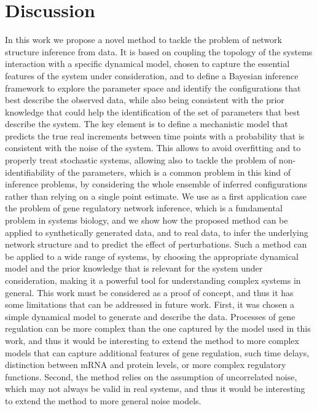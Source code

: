 \documentclass[10pt, aps, rmp,  twocolumn, superscriptaddress, floatfix, showkeys]{revtex4-2}
\begin{document}
\section{Discussion}
In this work we propose a novel method to tackle the problem of network structure inference from data. It is based on coupling the topology of the systems interaction with a specific dynamical model, chosen to capture the essential features of the system under consideration, and to define a Bayesian inference framework to explore the parameter space and identify the configurations that best describe the observed data, while also being consistent with the prior knowledge that could help the identification of the set of parameters that best describe the system. The key element is to define a mechanistic model that predicts the true real increments between time points with a probability that is consistent with the noise of the system. This allows to avoid overfitting and to properly treat stochastic systems, allowing also to tackle the problem of non-identifiability of the parameters, which is a common problem in this kind of inference problems, by considering the whole ensemble of inferred configurations rather than relying on a single point estimate.
We use as a first application case the problem of gene regulatory network inference, which is a fundamental problem in systems biology, and we show how the proposed method can be applied to synthetically generated data, and to real data, to infer the underlying network structure and to predict the effect of perturbations. Such a method can be applied to a wide range of systems, by choosing the appropriate dynamical model and the prior knowledge that is relevant for the system under consideration, making it a powerful tool for understanding complex systems in general. 
This work must be considered as a proof of concept, and thus it has some limitations that can be addressed in future work. 
First, it was chosen a simple dynamical model to generate and describe the data. Processes of gene regulation can be more complex than the one captured by the model used in this work, and thus it would be interesting to extend the method to more complex models that can capture additional features of gene regulation, such time delays, distinction between mRNA and protein levels, or more complex regulatory functions. 
Second, the method relies on the assumption of uncorrelated noise, which may not always be valid in real systems, and thus it would be interesting to extend the method to more general noise models. 
\end{document}
